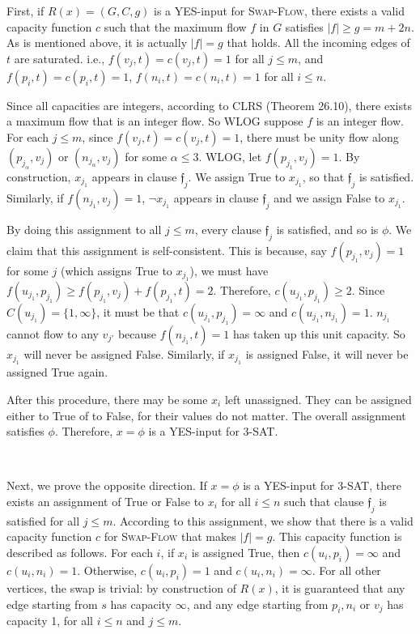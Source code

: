 \documentclass{article}
\begin{document}
First, if $R(x)=(G,C,g)$ is a YES-input for \textsc{Swap-Flow}, there exists a valid capacity function $c$ such that the maximum flow $f$ in $G$ satisfies $|f|\geqslant g=m+2n$. As is mentioned above, it is actually $|f|=g$ that holds. All the incoming edges of $t$ are saturated. i.e., $f(v_j,t)=c(v_j,t)=1$ for all $j\leqslant m$, and $f(p_i,t)=c(p_i,t)=1$, $f(n_i,t)=c(n_i,t)=1$ for all $i\leqslant n$.

Since all capacities are integers, according to CLRS (Theorem 26.10), there exists a maximum flow that is an integer flow. So WLOG suppose $f$ is an integer flow. For each $j\leqslant m$, since $f(v_j,t)=c(v_j,t)=1$, there must be unity flow along $(p_{j_\alpha},v_j)$ or $(n_{j_\alpha},v_j)$ for some $\alpha\leqslant3$. WLOG, let $f(p_{j_1},v_j)=1$. By construction, $x_{j_1}$ appears in clause $\mathfrak{f}_j$. We assign True to $x_{j_1}$, so that $\mathfrak{f}_j$ is satisfied. Similarly, if $f(n_{j_1},v_j)=1$, $\neg x_{j_1}$ appears in clause $\mathfrak{f}_j$ and we assign False to $x_{j_1}$.

By doing this assignment to all $j\leqslant m$, every clause $\mathfrak{f}_j$ is satisfied, and so is $\phi$. We claim that this assignment is self-consistent. This is because, say $f(p_{j_1},v_j)=1$ for some $j$ (which assigns True to $x_{j_1}$), we must have $f(u_{j_1},p_{j_1})\geqslant f(p_{j_1},v_j)+f(p_{j_1},t)=2$. Therefore, $c(u_{j_1},p_{j_1})\geqslant2$. Since $C(u_{j_1})=\{1,\infty\}$, it must be that $c(u_{j_1},p_{j_1})=\infty$ and $c(u_{j_1},n_{j_1})=1$. $n_{j_1}$ cannot flow to any $v_{j'}$ because $f(n_{j_1},t)=1$ has taken up this unit capacity. So $x_{j_1}$ will never be assigned False. Similarly, if $x_{j_1}$ is assigned False, it will never be assigned True again.

After this procedure, there may be some $x_i$ left unassigned. They can be assigned either to True of to False, for their values do not matter. The overall assignment satisfies $\phi$. Therefore, $x=\phi$ is a YES-input for \textsc{3-SAT}.

~

Next, we prove the opposite direction. If $x=\phi$ is a YES-input for \textsc{3-SAT}, there exists an assignment of True or False to $x_i$ for all $i\leqslant n$ such that clause $\mathfrak{f}_j$ is satisfied for all $j\leqslant m$. According to this assignment, we show that there is a valid capacity function $c$ for \textsc{Swap-Flow} that makes $|f|=g$. This capacity function is described as follows. For each $i$, if $x_i$ is assigned True, then $c(u_i,p_i)=\infty$ and $c(u_i,n_i)=1$. Otherwise, $c(u_i,p_i)=1$ and $c(u_i,n_i)=\infty$. For all other vertices, the swap is trivial: by construction of $R(x)$, it is guaranteed that any edge starting from $s$ has capacity $\infty$, and any edge starting from $p_i,n_i$ or $v_j$ has capacity 1, for all $i\leqslant n$ and $j\leqslant m$.
\end{document}
